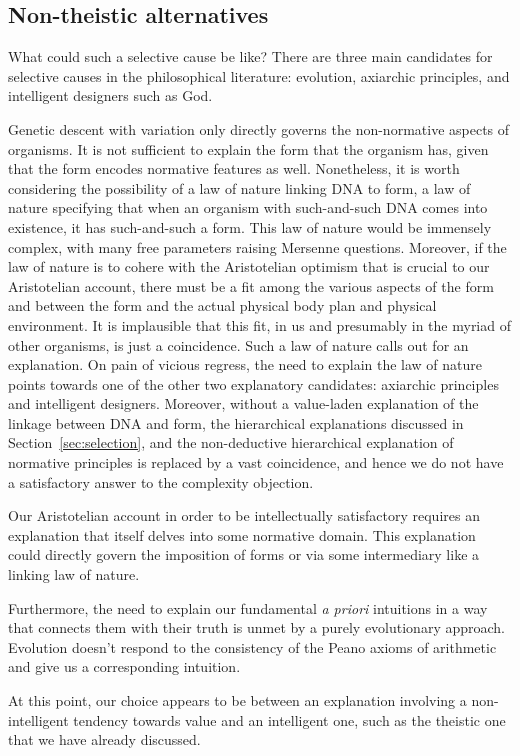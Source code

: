 \subsection{Non-theistic alternatives}
What could such a selective cause be like? There are three main candidates for selective causes in the philosophical
literature: evolution, axiarchic principles, and intelligent designers such as God. 

Genetic descent with variation only directly governs the non-normative aspects of organisms. It is not sufficient to explain
the form that the organism has, given that the form encodes normative features as well. Nonetheless, it is worth considering
the possibility of a law of nature linking DNA to form, a law of nature specifying that when an organism with such-and-such 
DNA comes into existence, it has such-and-such a form. This law of nature would be immensely complex, with many free parameters
raising Mersenne questions. Moreover, if the law of nature is to cohere with the Aristotelian optimism that is crucial to our
Aristotelian account, there must be a fit among the various aspects of the form and between the form and the actual physical 
body plan and physical environment. It is implausible that this fit, in us and presumably in the myriad of other organisms,
is just a coincidence. Such a law of nature calls out for an explanation. On pain of vicious regress, the need to explain the 
law of nature points towards one of the other two explanatory candidates: axiarchic principles and intelligent designers.
Moreover, without a value-laden explanation of the linkage between DNA and form, the hierarchical explanations discussed 
in Section~\ref{sec:selection}, and the non-deductive hierarchical explanation of normative principles is replaced by a vast
coincidence, and hence we do not have a satisfactory answer to the complexity objection. 

Our Aristotelian account in order to be intellectually satisfactory requires an explanation that itself delves into some 
normative domain. This explanation could directly govern the imposition of forms or via some intermediary like a linking
law of nature. 

Furthermore, the need to explain our fundamental \textit{a priori} intuitions in a way that connects them with their truth
is unmet by a purely evolutionary approach. Evolution doesn't respond to the consistency of the Peano axioms of arithmetic 
and give us a corresponding intuition.

At this point, our choice appears to be between an explanation involving a non-intelligent tendency towards value and an intelligent one,
such as the theistic one that we have already discussed.

